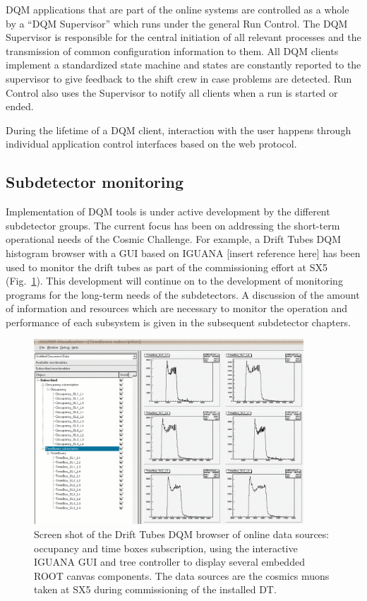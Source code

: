\documentclass[a4paper]{cmspaper}
\begin{document}
DQM applications that are part of the online systems are controlled as a
whole by a ``DQM Supervisor'' which runs under the general Run Control.
The DQM Supervisor is responsible for the central initiation of all relevant processes and the
transmission of common configuration information to them. All DQM clients implement a standardized
state machine and states are constantly reported to the supervisor
to give feedback to the shift crew in case problems are detected.
Run Control also uses the Supervisor to notify all clients when a run is started or
ended.

During the lifetime of a DQM client, interaction with the user happens through individual
application control interfaces based on the web protocol.



\subsection{Subdetector monitoring}\label{sec:subdetMonitoring}

Implementation of DQM tools is under active development by
the different
subdetector groups.
The current focus has been on addressing the short-term operational
needs of the Cosmic Challenge. For example,
a Drift Tubes DQM histogram browser with
a GUI based on IGUANA [insert reference here] has been used to
monitor the drift tubes as part of the commissioning effort at SX5
(Fig.~\ref{iguana-dqm}). This development will continue
on to the development of
monitoring programs
for the long-term needs of the subdetectors. A discussion of
the amount of information and resources which are necessary to monitor the operation
and performance of each subsystem is given in the subsequent subdetector chapters.
%
%

%
\begin{figure}[!htbp]
\begin{center}
\includegraphics[width=0.9\textwidth]{iguana-dqm}
\caption{Screen shot of the Drift Tubes DQM browser of online data
sources: occupancy and time boxes subscription,
            using the interactive IGUANA  GUI and tree controller to display
            several embedded ROOT canvas components. The data sources are the cosmics muons taken at SX5
during commissioning of the installed DT.\label{iguana-dqm}}
\end{center}
\end{figure}
\end{document}
